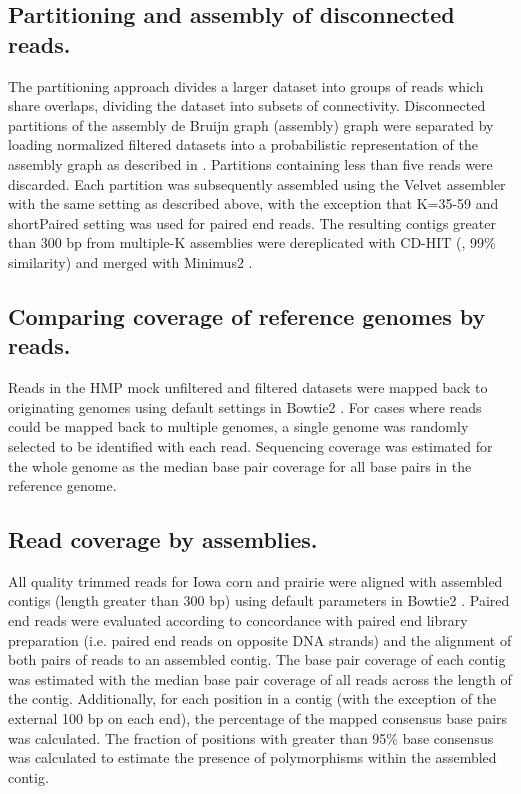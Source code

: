 \documentclass{pnastwo}
\begin{document}
\begin{article}
\subsection*{Partitioning and assembly of disconnected reads.}
The partitioning approach divides a larger dataset into groups of reads which share overlaps, dividing the dataset into subsets of connectivity.  Disconnected partitions of the assembly de Bruijn graph (assembly) graph were separated by loading normalized filtered datasets into a probabilistic
representation of the assembly graph as described in \cite{Pell:2012cq}.
Partitions containing less than five reads were discarded.  Each
partition was subsequently assembled using the Velvet assembler with
the same setting as described above, with the exception that K=35-59
and shortPaired setting was used for paired end reads.  The resulting
contigs greater than 300 bp from multiple-K assemblies were
dereplicated with CD-HIT (\cite{Fu:2012jk}, 99\% similarity) and merged with
Minimus2 \cite{Sommer:2007p1253}.


\subsection*{Comparing coverage of reference genomes by reads.}
Reads in the HMP mock unfiltered and filtered datasets were mapped
back to originating genomes using default settings in Bowtie2
\cite{bowtie}.  For cases where reads could be mapped back to multiple
genomes, a single genome was randomly selected to be identified with
each read.  Sequencing coverage was estimated for the whole genome as
the median base pair coverage for all base pairs in the reference
genome.

\subsection*{Read coverage by assemblies.}
All quality trimmed reads for Iowa corn and prairie were aligned with
assembled contigs (length greater than 300 bp) using default
parameters in Bowtie2 \cite{bowtie}.  Paired end reads were evaluated according to
concordance with paired end library preparation (i.e. paired end reads
on opposite DNA strands) and the alignment of both pairs of reads to
an assembled contig.  The base pair coverage of each contig was
estimated with the median base pair coverage of all reads across the
length of the contig.  Additionally, for each position in a contig
(with the exception of the external 100 bp on each end), the
percentage of the mapped consensus base pairs was calculated.  The
fraction of positions with greater than 95\% base consensus was
calculated to estimate the presence of polymorphisms within the
assembled contig.  


\end{article}
\end{document}
